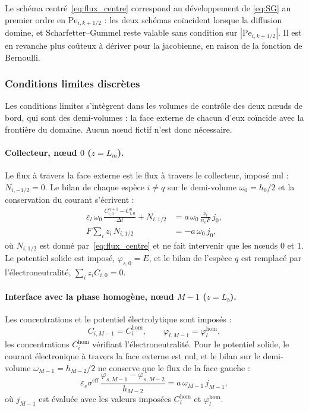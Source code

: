 Le schéma centré~\eqref{eq:flux_centre} correspond au développement de
\eqref{eq:SG} au premier ordre en $\mathrm{Pe}_{i,k+1/2}$ : les deux schémas coïncident lorsque
la diffusion domine, et Scharfetter--Gummel reste valable sans condition sur
$|\mathrm{Pe}_{i,k+1/2}|$. Il est en revanche plus coûteux à dériver pour la jacobienne, en raison
de la fonction de Bernoulli.

\subsubsection*{Conditions limites discrètes}

Les conditions limites s'intègrent dans les volumes de contrôle des deux
nœuds de bord, qui sont des demi-volumes : la face externe de chacun d'eux
coïncide avec la frontière du domaine. Aucun nœud fictif n'est donc
nécessaire.

\paragraph{Collecteur, nœud $0$ ($z = L_m$).} Le flux à travers la face
externe est le flux à travers le collecteur, imposé nul :
$N_{i,-1/2} = 0$. Le bilan de chaque espèce $i \neq q$ sur le demi-volume
$\omega_0 = h_0/2$ et la conservation du courant s'écrivent :
\begin{align}
\varepsilon_l\,\omega_0\,\frac{C_{i,0}^{n+1} - C_{i,0}^{n}}{\Delta t}
+ N_{i,1/2} &= a\,\omega_0\,\frac{\nu_i}{n_eF}\,j_0 ,
\label{eq:CL0_espece}\\
F\sum_i z_i\,N_{i,1/2} &= -a\,\omega_0\,j_0 ,
\label{eq:CL0_charge}
\end{align}
où $N_{i,1/2}$ est donné par~\eqref{eq:flux_centre} et ne fait intervenir
que les nœuds $0$ et $1$. Le potentiel solide est imposé, $\varphi_{s,0} = E$,
et le bilan de l'espèce $q$ est remplacé par l'électroneutralité,
$\sum_i z_i C_{i,0} = 0$.

\paragraph{Interface avec la phase homogène, nœud $M-1$ ($z = L_b$).} Les
concentrations et le potentiel électrolytique sont imposés :
\begin{equation}
C_{i,M-1} = C_i^{\mathrm{hom}}, \qquad
\varphi_{l,M-1} = \varphi_l^{\mathrm{hom}},
\label{eq:CLM_dirichlet}
\end{equation}
les concentrations $C_i^{\mathrm{hom}}$ vérifiant l'électroneutralité. Pour
le potentiel solide, le courant électronique à travers la face externe est
nul, et le bilan sur le demi-volume $\omega_{M-1} = h_{M-2}/2$ ne conserve que
le flux de la face gauche :
\begin{equation}
\varepsilon_s\sigma^{\mathrm{eff}}\,
\frac{\varphi_{s,M-1} - \varphi_{s,M-2}}{h_{M-2}}
= a\,\omega_{M-1}\, j_{M-1} ,
\label{eq:CLM_ohm}
\end{equation}
où $j_{M-1}$ est évaluée avec les valeurs imposées $C_i^{\mathrm{hom}}$ et
$\varphi_l^{\mathrm{hom}}$.

